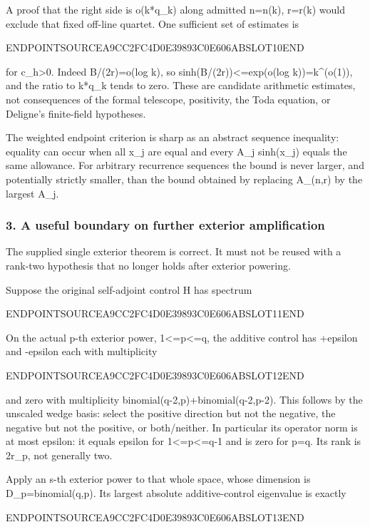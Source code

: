 A proof that the right side is o(k*q\_k) along admitted n=n(k), r=r(k) would exclude that fixed off-line quartet. One sufficient set of estimates is

ENDPOINTSOURCEA9CC2FC4D0E39893C0E606ABSLOT10END

for c\_h\textgreater0. Indeed B/(2r)=o(log k), so sinh(B/(2r))\textless=exp(o(log k))=k\^{}(o(1)), and the ratio to k*q\_k tends to zero. These are candidate arithmetic estimates, not consequences of the formal telescope, positivity, the Toda equation, or Deligne's finite-field hypotheses.

The weighted endpoint criterion is sharp as an abstract sequence inequality: equality can occur when all x\_j are equal and every A\_j sinh(x\_j) equals the same allowance. For arbitrary recurrence sequences the bound is never larger, and potentially strictly smaller, than the bound obtained by replacing A\_(n,r) by the largest A\_j.

\subsubsection{3. A useful boundary on further exterior amplification}\label{endpoint-pr23_corrected--a-useful-boundary-on-further-exterior-amplification}

The supplied single exterior theorem is correct. It must not be reused with a rank-two hypothesis that no longer holds after exterior powering.

Suppose the original self-adjoint control H has spectrum

ENDPOINTSOURCEA9CC2FC4D0E39893C0E606ABSLOT11END

On the actual p-th exterior power, 1\textless=p\textless=q, the additive control has +epsilon and -epsilon each with multiplicity

ENDPOINTSOURCEA9CC2FC4D0E39893C0E606ABSLOT12END

and zero with multiplicity binomial(q-2,p)+binomial(q-2,p-2). This follows by the unscaled wedge basis: select the positive direction but not the negative, the negative but not the positive, or both/neither. In particular its operator norm is at most epsilon: it equals epsilon for 1\textless=p\textless=q-1 and is zero for p=q. Its rank is 2r\_p, not generally two.

Apply an s-th exterior power to that whole space, whose dimension is D\_p=binomial(q,p). Its largest absolute additive-control eigenvalue is exactly

ENDPOINTSOURCEA9CC2FC4D0E39893C0E606ABSLOT13END

